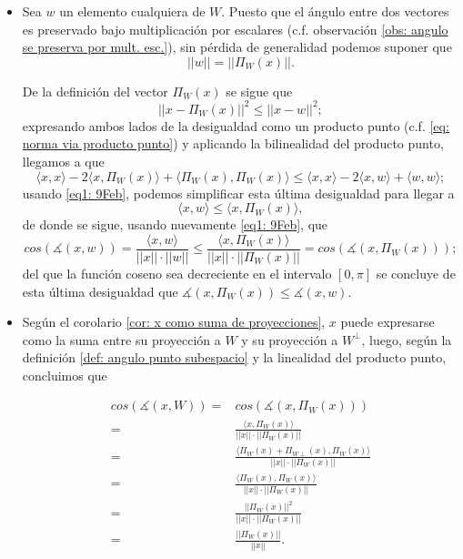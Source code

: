 \begin{itemize}
\item  Sea $w$ un elemento cualquiera de $W$.
Puesto que el ángulo entre dos vectores es
preservado bajo multiplicación por escalares
(c.f. observación
\ref{obs: angulo se preserva por mult. esc.}), sin pérdida de generalidad
podemos suponer que 
\begin{equation}
\label{eq1: 9Feb}
||w||= || \Pi_{W}(x)||.
\end{equation}

De la definición del vector $\Pi_{W}(x)$ se sigue que
\[
|| x -\Pi_{W}(x) ||^{2} \leq  || x - w||^{2};
\]
expresando ambos lados de la desigualdad como un producto
punto (c.f. \eqref{eq: norma via producto punto}) y aplicando la
bilinealidad del producto punto, llegamos a que
\[
\langle x , x \rangle -2 \langle x, \Pi_{W}(x) \rangle +
\langle \Pi_{W}(x) , \Pi_{W}(x) \rangle \leq 
\langle x , x \rangle  -2 \langle x , w \rangle 
+ \langle w , w \rangle ;
\]
usando \eqref{eq1: 9Feb}, podemos simplificar esta
última desigualdad para llegar a 
\[
\langle x, w \rangle \leq \langle x, \Pi_{W}(x) \rangle,
\]
de donde se sigue, usando nuevamente \eqref{eq1: 9Feb},
que 
\[
cos \left( \measuredangle (x,w) \right) =
\frac{\langle x , w \rangle}{||x||\cdot ||w||} \leq
\frac{\langle x ,  \Pi_{W}(x)  \rangle}{||x||\cdot ||\Pi_{W}(x) ||} =
cos \left( \measuredangle \left(x, \Pi_{W}(x) \right) \right);
\]
del que la función coseno sea decreciente en el intervalo
$[0, \pi]$ se concluye de esta última desigualdad que
$ \measuredangle \left(x, \Pi_{W}(x) \right) \leq 
\measuredangle (x,w)$.

\item Según el corolario 
\ref{cor: x como suma de proyecciones}, 
$x$ puede expresarse como la suma entre su proyección
a $W$ y su proyección a $W^{\perp}$, luego,
según la definición \ref{def: angulo punto subespacio}
y la linealidad del producto punto, concluimos que

\begin{align*}
cos \left( \measuredangle (x, W) \right) = &
cos \left( \measuredangle (x, \Pi_{W}(x)) \right)  \\
= & 
\frac{\langle x , \Pi_{W}(x) \rangle}{||x|| \cdot || \Pi_{W}(x)||}  \\
= & 
\frac{\langle \Pi_{W}(x)+\Pi_{W\perp}(x) , \Pi_{W}(x) \rangle}{||x|| \cdot || \Pi_{W}(x)||}\\
= & \frac{\langle \Pi_{W}(x) , \Pi_{W}(x) \rangle}{||x|| \cdot || \Pi_{W}(x)||}\\
= & \frac{|| \Pi_{W}(x) ||^{2}}{||x|| \cdot || \Pi_{W}(x)||}\\
= & \frac{|| \Pi_{W}(x) ||}{||x||}.
\end{align*}
\end{itemize}

